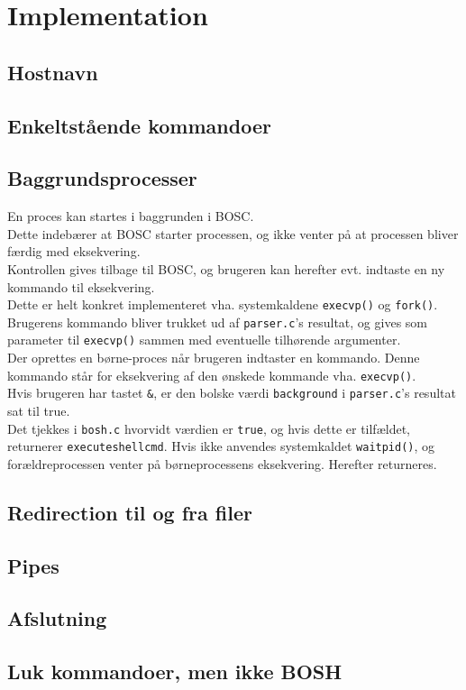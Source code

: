 \section{Implementation}
\subsection{Hostnavn}
\subsection{Enkeltstående kommandoer}
\subsection{Baggrundsprocesser}
En proces kan startes i baggrunden i BOSC. \\ 
Dette indebærer at BOSC starter processen, og ikke venter på at processen bliver færdig med eksekvering. \\
Kontrollen gives tilbage til BOSC, og brugeren kan herefter evt. indtaste en ny kommando til eksekvering. \\
Dette er helt konkret implementeret vha. systemkaldene \verb+execvp()+ og \verb+fork()+. Brugerens kommando bliver trukket ud af \verb+parser.c+'s resultat, og gives som parameter til \verb+execvp()+ sammen med eventuelle tilhørende argumenter. \\
Der oprettes en børne-proces når brugeren indtaster en kommando. Denne kommando står for eksekvering af den ønskede kommande vha. \verb+execvp()+. \\
Hvis brugeren har tastet \verb+&+, er den bolske værdi \verb+background+ i \verb+parser.c+'s resultat sat til true. \\
Det tjekkes i \verb+bosh.c+ hvorvidt værdien er \verb+true+, og hvis dette er tilfældet, returnerer \verb+executeshellcmd+. Hvis ikke anvendes systemkaldet \verb+waitpid()+, og forældreprocessen venter på børneprocessens eksekvering. Herefter returneres.
\subsection{Redirection til og fra filer}
\subsection{Pipes}
\subsection{Afslutning}
\subsection{Luk kommandoer, men ikke BOSH}

